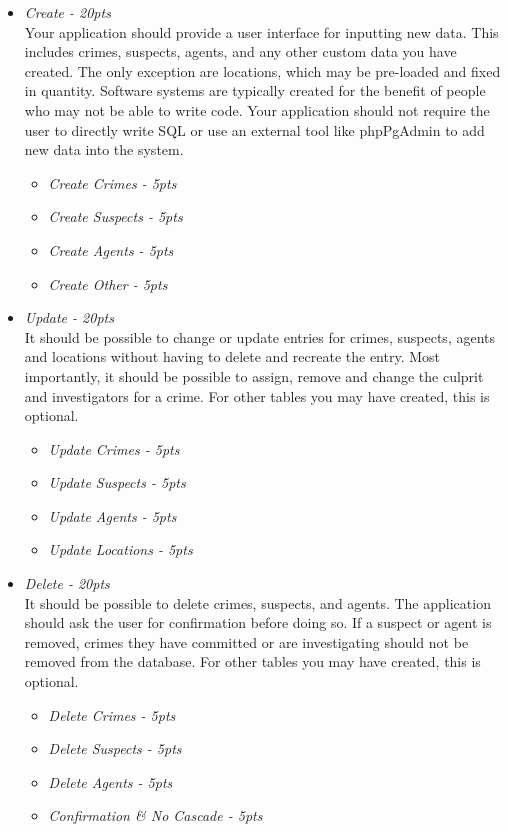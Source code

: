 \documentclass[12pt]{article}
\begin{document}
\begin{itemize}
\item \textit{Create - 20pts} \\
Your application should provide a user interface for inputting new data. This includes crimes, suspects, agents, and any other custom data you have created. The only exception are locations, which may be pre-loaded and fixed in quantity. Software systems are typically created for the benefit of people who may not be able to write code. Your application should not require the user to directly write SQL or use an external tool like phpPgAdmin to add new data into the system.
\begin{itemize}
\item \textit{Create Crimes - 5pts}
\item \textit{Create Suspects - 5pts}
\item \textit{Create Agents - 5pts}
\item \textit{Create Other - 5pts}
\end{itemize}

\item \textit{Update - 20pts} \\
It should be possible to change or update entries for crimes, suspects, agents and locations without having to delete and recreate the entry. Most importantly, it should be possible to assign, remove and change the culprit and investigators for a crime. For other tables you may have created, this is optional.
\begin{itemize}
\item \textit{Update Crimes - 5pts}
\item \textit{Update Suspects - 5pts}
\item \textit{Update Agents - 5pts}
\item \textit{Update Locations - 5pts}
\end{itemize}

\item \textit{Delete - 20pts} \\
It should be possible to delete crimes, suspects, and agents. The application should ask the user for confirmation before doing so. If a suspect or agent is removed, crimes they have committed or are investigating should not be removed from the database. For other tables you may have created, this is optional.
\begin{itemize}
\item \textit{Delete Crimes - 5pts}
\item \textit{Delete Suspects - 5pts}
\item \textit{Delete Agents - 5pts}
\item \textit{Confirmation \& No Cascade - 5pts}
\end{itemize}


\end{itemize}
\end{document}
